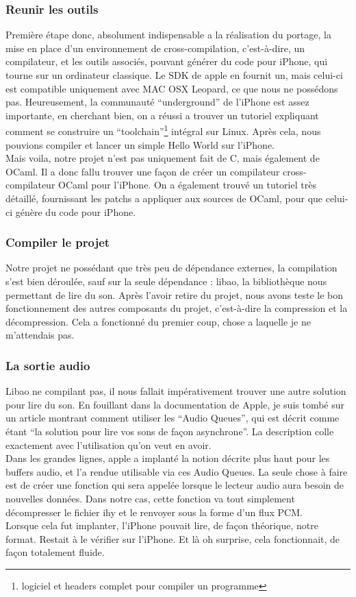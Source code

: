 \documentclass[a4paper,12pt]{article}
\begin{document}
		\subsubsection{Reunir les outils}
Première étape donc, absolument indispensable a la réalisation du
portage, la mise en place d'un environnement de cross-compilation,
c'est-à-dire, un compilateur, et les outils associés,  pouvant générer du code
pour iPhone, qui
tourne sur un ordinateur classique. Le SDK de apple en fournit un, mais
celui-ci est compatible uniquement avec MAC OSX Leopard, ce que nous ne
possédons pas. Heureusement, la communauté ``underground'' de l'iPhone
est assez importante, en cherchant bien, on a réussi a trouver un
tutoriel expliquant comment se construire un
``toolchain''\footnote{logiciel et headers complet pour compiler un
programme} intégral sur Linux. Après cela, nous pouvions compiler et lancer un
simple Hello World sur l'iPhone.\\
Mais voila, notre projet n'est pas uniquement fait de C, mais également
de OCaml. Il a donc fallu trouver une façon de créer un compilateur
cross-compilateur OCaml
pour l'iPhone. On a également trouvé un tutoriel très détaillé, fournissant les
patchs a appliquer aux sources de OCaml, pour que celui-ci génère du code pour
iPhone.
		\subsubsection{Compiler le projet}
Notre projet ne possédant que très peu de dépendance externes, la
compilation s'est bien déroulée, sauf sur la seule dépendance : libao, la
bibliothèque nous permettant de lire du son. Après l'avoir retire du
projet, nous avons teste le bon fonctionnement des autres composants du
projet, c'est-à-dire la compression et la décompression. Cela a
fonctionné du premier coup, chose a laquelle je ne m'attendais pas.\\
		\subsubsection{La sortie audio}
Libao ne compilant pas, il nous fallait impérativement trouver une autre
solution pour lire du son. En fouillant dans la documentation de Apple, je suis
tombé sur un article montrant comment utiliser les ``Audio Queues'', qui est
décrit comme étant ``la solution pour lire vos sons de façon asynchrone''. La
description colle exactement avec l'utilisation qu'on veut en avoir.\\
Dans les grandes lignes, apple a implanté la notion décrite plus haut pour
les buffers audio, et l'a rendue utilisable via ces Audio Queues. La seule chose
à faire est de créer une fonction qui sera appelée lorsque le lecteur audio aura
besoin de nouvelles données. Dans notre cas, cette fonction va tout simplement
décompresser le fichier ihy et le renvoyer sous la forme d'un flux PCM.\\
Lorsque cela fut implanter, l'iPhone pouvait lire, de façon théorique, notre
format. Restait à le vérifier sur l'iPhone. Et là oh surprise, cela
fonctionnait, de façon totalement fluide. 
\end{document}
